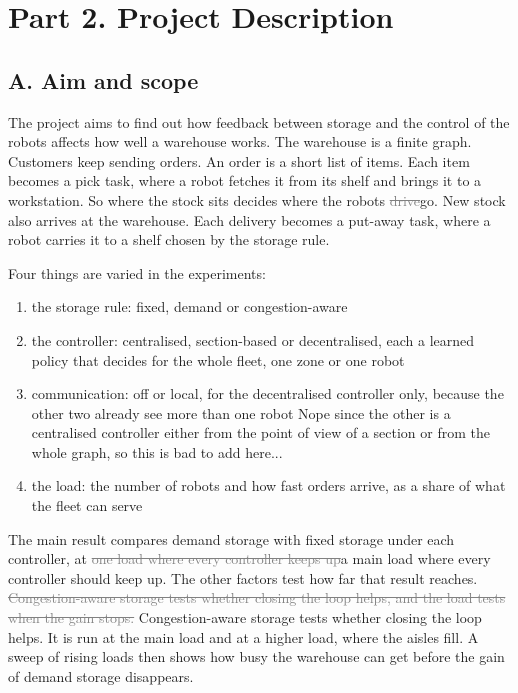 \documentclass[11pt,a4paper]{article}
\newcommand{\new}[1]{\textcolor{newc}{#1}}
\newcommand{\old}[1]{\textcolor{gray}{\sout{#1}}}
\begin{document}
\section*{Part 2. Project Description}

\subsection*{A. Aim and scope}

The project aims to find out how feedback between storage and the control of the robots affects how
well a warehouse works. The warehouse is a finite graph. Customers keep sending orders. An order is a
short list of items. Each item becomes a pick task, where a robot fetches it from its shelf and brings
it to a workstation. So where the stock sits decides where the robots \old{drive}\new{go}. New stock
also arrives at the warehouse. Each delivery becomes a put-away task, where a robot carries it to a
shelf chosen by the storage rule.

Four things are varied in the experiments:
\begin{enumerate}[leftmargin=2em]
  \item the storage rule: fixed, demand or congestion-aware
  \item the controller: centralised, section-based or decentralised, each a learned policy that
    decides for the whole fleet, one zone or one robot
  \item communication: off or local, for the decentralised controller only\new{, because the other
    two already see more than one robot} Nope since the other is a centralised controller either from the point of view of a section or from the whole graph, so this is bad to add here... 
  \item the load: the number of robots and how fast orders arrive, as a share of what the fleet can
    serve
\end{enumerate}

The main result compares demand storage with fixed storage under each controller, at \old{one load
where every controller keeps up}\new{a main load where every controller should keep up}. The other
factors test how far that result reaches. \old{Congestion-aware storage tests whether closing the
loop helps, and the load tests when the gain stops.} \new{Congestion-aware storage tests whether
closing the loop helps. It is run at the main load and at a higher load, where the aisles fill. A
sweep of rising loads then shows how busy the warehouse can get before the gain of demand storage
disappears.}
\end{document}
